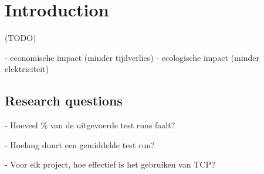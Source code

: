 \chapter{Introduction}
(TODO)

- economische impact (minder tijdverlies)
- ecologische impact (minder elektriciteit)

\section{Research questions}
- Hoeveel \% van de uitgevoerde test runs faalt?

- Hoelang duurt een gemiddelde test run?

- Voor elk project, hoe effectief is het gebruiken van TCP?